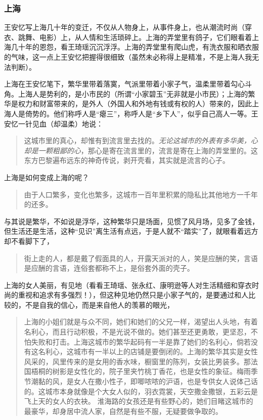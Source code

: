 \subsubsection{上海}

王安忆写上海几十年的变迁，不仅从人物身上，从事件身上，也从潮流时尚（穿衣、跳舞、电影）上，从人情和生活琐碎上。上海的弄堂里有鸽子，它们眼看着上海几十年的恩怨，看王琦瑶沉沉浮浮。上海的弄堂里有爬山虎，有洗衣服和晒衣服的气味，这一点上王安忆把握得很细致（虽然未必称得上是精准，不是上海人我无法判断）。

上海在王安忆笔下，繁华里带着落寞，气派里带着小家子气，温柔里带着勾心斗角。上海人是势利的，是小市民的（所谓“小家碧玉”无非就是小市民）；上海的繁华是权力和财富带来的，是外人（外国人和外地有钱或有权的人）带来的，因此上海人是倚势的。他们称呼人是“瘪三”，称呼人是“乡下人”，似乎自己高人一等。王安忆一针见血（却温柔）地说：
\begin{quotation}
这城市里的真心，却惟有到流言里去找的。\emph{无论这城市的外表有多华美，心却是一颗粗鄙的心}，那心是寄在流言里的，流言是寄在上海的弄堂里的。这东方巴黎遍布远东的神奇传说，剥开壳看，其实就是流言的心子。
\end{quotation}
上海是如何变成上海的呢？
\begin{quotation}
由于人口繁多，变化也繁多，这城市一百年里积累的隐私比其他地方一千年的还多。
\end{quotation}
与其说是繁华，不如说是浮华，这种繁华只是场面，见惯了风月场，见多了金钱，但生活还是生活，这种“见识”离生活有点远，于是人就不“踏实”了，就眼看着远方却不看脚下了，
\begin{quotation}
街上走的人，都是戴了假面具的人，开露天派对的人，笑是应酬的笑，言语是应酬的言语，连俗套都称不上，是俗套外面的壳子。
\end{quotation}
上海的女人美丽，有见地（看看王琦瑶、张永红、康明逊等人对生活精细和穿衣时尚的重视和追求有多强烈！），但这种见地仍然只是小家子气的，是要通过和人比较的，不是自我的信心，而是来自他人的羡慕的眼光，
\begin{quotation}
上海的小姐们就是与众不同，她们和她们的父兄一样，渴望出人头地，有着名利心，而且行动积极，不是光说不做的。她们甚至还更勇敢，更坚忍，不怕失败和打击。上海这城市的繁华起码有一半是靠了她们的名利心，倘若没有这名利心，这城市有一半以上的店铺是要倒闭的。上海的繁华其实是女性风采的，风里传来的是女用的香水味，橱窗里的陈列，女装比男装多。那法国梧桐的树影是女性化的，院子里夹竹桃丁香花，也是女性的象征。梅雨季节潮黏的风，是女人在撒小性子，即唧哝哝的沪语，也是专供女人说体己话的。这城市本身就像是个大女人似的，羽衣霓裳，天空撒金撒银，五彩云是飞上天的女人的衣袂。 
淮海路的女孩还是有些野心的，她们目睹这城市的最豪华，却身居中流人家，自然是有些不服，无疑要做争取的。
\end{quotation}
